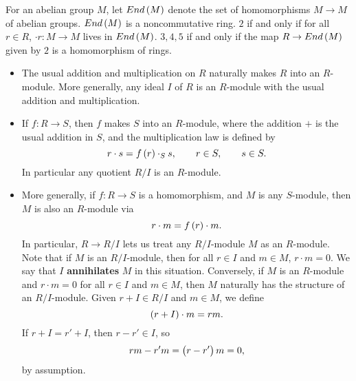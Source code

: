 \begin{note*}
For an abelian group $ M $, let $ End\br{M} $ denote the set of homomorphisms $ M \to M $ of abelian groups. $ End\br{M} $ is a noncommutative ring. $ 2 $ if and only if for all $ r \in R $, $ \cdot r : M \to M $ lives in $ End\br{M} $. $ 3, 4, 5 $ if and only if the map $ R \to End\br{M} $ given by $ 2 $ is a homomorphism of rings.
\end{note*}

\begin{example*}
\hfill
\begin{itemize}
\item The usual addition and multiplication on $ R $ naturally makes $ R $ into an $ R $-module. More generally, any ideal $ I $ of $ R $ is an $ R $-module with the usual addition and multiplication.
\item If $ f : R \to S $, then $ f $ makes $ S $ into an $ R $-module, where the addition $ + $ is the usual addition in $ S $, and the multiplication law is defined by
$$ r \cdot s = f\br{r} \cdot_S s, \qquad r \in S, \qquad s \in S. $$
In particular any quotient $ R / I $ is an $ R $-module.
\item More generally, if $ f : R \to S $ is a homomorphism, and $ M $ is any $ S $-module, then $ M $ is also an $ R $-module via
$$ r \cdot m = f\br{r} \cdot m. $$
In particular, $ R \to R / I $ lets us treat any $ R / I $-module $ M $ as an $ R $-module. Note that if $ M $ is an $ R / I $-module, then for all $ r \in I $ and $ m \in M $, $ r \cdot m = 0 $. We say that $ I $ \textbf{annihilates} $ M $ in this situation. Conversely, if $ M $ is an $ R $-module and $ r \cdot m = 0 $ for all $ r \in I $ and $ m \in M $, then $ M $ naturally has the structure of an $ R / I $-module. Given $ r + I \in R / I $ and $ m \in M $, we define
$$ \br{r + I} \cdot m = rm. $$
If $ r + I = r' + I $, then $ r - r' \in I $, so
$$ rm - r'm = \br{r - r'}m = 0, $$
by assumption.

\pagebreak


\end{itemize}
\end{example*}
